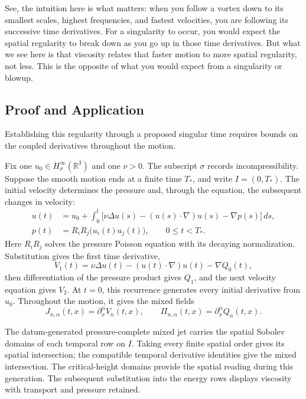 See, the intuition here is what matters: when you follow a vortex down to
its smallest scales, highest frequencies, and fastest velocities, you are
following its successive time derivatives. For a singularity to occur,
you would expect the spatial regularity to break down as you go up in
those time derivatives. But what we see here is that viscosity relates
that faster motion to more spatial regularity, not less. This is the
opposite of what you would expect from a singularity or blowup.

\vspace{2\baselineskip}
\subsection*{Proof and Application}

Establishing this regularity through a proposed singular time requires bounds
on the coupled derivatives throughout the motion.

Fix one \(u_0\in H^\infty_\sigma(\mathbb R^3)\) and one \(\nu>0\).
The subscript \(\sigma\) records incompressibility. Suppose the smooth
motion ends at a finite time \(T_*\), and write \(I=(0,T_*)\).
The initial velocity determines the pressure and, through the equation,
the subsequent changes in velocity:
\[
 \begin{aligned}
 u(t)&=u_0+\int_0^t
 \bigl[\nu\Delta u(s)-(u(s)\cdot\nabla)u(s)-\nabla p(s)\bigr]\,ds,\\
 p(t)&=R_iR_j\bigl(u_i(t)u_j(t)\bigr),
 \qquad 0\le t<T_*.
 \end{aligned}
\]
Here \(R_iR_j\) solves the pressure Poisson equation with its decaying
normalization. Substitution gives the first time derivative,
\[
 V_1(t)=\nu\Delta u(t)-(u(t)\cdot\nabla)u(t)-\nabla Q_0(t),
\]
then differentiation of the pressure product gives \(Q_1\), and the
next velocity equation gives \(V_2\). At \(t=0\), this recurrence
generates every initial derivative from \(u_0\). Throughout the motion,
it gives the mixed fields
\[
 J_{n,\alpha}(t,x)=\partial_x^\alpha V_n(t,x),
 \qquad
 \Pi_{n,\alpha}(t,x)=\partial_x^\alpha Q_n(t,x).
\]

The datum-generated pressure-complete mixed jet carries the spatial Sobolev
domains of each temporal row on \(I\). Taking every finite spatial order
gives its spatial intersection; the compatible temporal derivative identities
give the mixed intersection. The critical-height domains provide the spatial
reading during this generation. The subsequent substitution into the energy
rows displays viscosity with transport and pressure retained.

